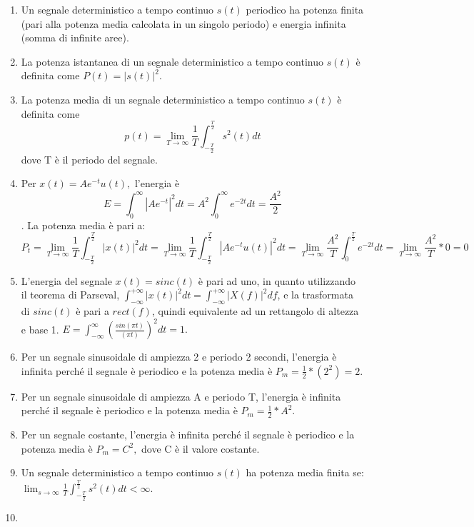 \documentclass[
  paper=a4,
  ,captions=tableheading
]{scrartcl}
\providecommand{\tightlist}{%
  \setlength{\itemsep}{0pt}\setlength{\parskip}{0pt}}
\begin{document}
\begin{enumerate}
\def\labelenumi{\arabic{enumi}.}
\tightlist
\item
  Un segnale deterministico a tempo continuo \(s(t)\) periodico ha
  potenza finita (pari alla potenza media calcolata in un singolo
  periodo) e energia infinita (somma di infinite aree).
\item
  La potenza istantanea di un segnale deterministico a tempo continuo
  \(s(t)\) è definita come \(P(t) = |s(t)|^2\).
\item
  La potenza media di un segnale deterministico a tempo continuo
  \(s(t)\) è definita come \[
  p(t) = \lim_{T\to\infty} \frac{1}{T} \int_{-\frac{T}{2}}^{\frac{T}{2}} s^2(t) dt
  \] dove T è il periodo del segnale.
\item
  Per \(x(t) = Ae^{-t}u(t),\) l'energia è \[
  \displaystyle E = \int_0^\infty |Ae^{-t}|^2 dt = A^2 \int_0^\infty e^{-2t} dt = \frac{A^2}{2}
  \]. La potenza media è pari a: \[
  \displaystyle P_t = \lim_{T \to \infty} \frac{1}{T} \int_{-\frac{T}{2}}^{\frac{T}{2}} |x(t)|^2 dt = \lim_{T \to \infty} \frac{1}{T} \int_{-\frac{T}{2}}^{\frac{T}{2}} |A e^{-t} u(t)|^2 dt =  \lim_{T \to \infty} \frac{A^2}{T} \int_{0}^{\frac{T}{2}} e^{-2t} dt = \lim_{T \to \infty} \frac{A^2}{T}*0 = 0
  \]
\item
  L'energia del segnale \(x(t) = sinc(t)\) è pari ad uno, in quanto
  utilizzando il teorema di Parseval,
  \(\displaystyle\int_{-\infty}^{+\infty}|x(t)|^2dt = \int_{-\infty}^{+\infty}|X(f)|^2df\),
  e la trasformata di \(sinc(t)\) è pari a \(rect(f)\), quindi
  equivalente ad un rettangolo di altezza e base 1.
  \(\displaystyle E = \int_{-\infty}^\infty (\frac{sin(\pi t)}{( \pi t)})^2 dt = 1.\)
\item
  Per un segnale sinusoidale di ampiezza 2 e periodo 2 secondi,
  l'energia è infinita perché il segnale è periodico e la potenza media
  è \(P_m = \frac{1}{2} * (2^2) = 2.\)
\item
  Per un segnale sinusoidale di ampiezza A e periodo T, l'energia è
  infinita perché il segnale è periodico e la potenza media è
  \(P_m = \frac{1}{2} * A^2\).
\item
  Per un segnale costante, l'energia è infinita perché il segnale è
  periodico e la potenza media è \(P_m = C^2,\) dove C è il valore
  costante.
\item
  Un segnale deterministico a tempo continuo \(s(t)\) ha potenza media
  finita se:
  \(\displaystyle \lim_{s\to\infty} \frac{1}{T} \int_{-\frac{T}{2}}^{\frac{T}{2}} s^2(t)dt < \infty\).
\item

\end{enumerate}
\end{document}
